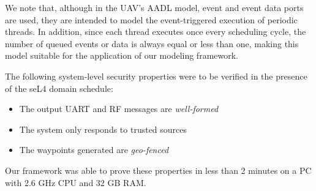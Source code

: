 We note that, although in the UAV's AADL model, event and event data ports are used, they are intended to model the event-triggered execution of periodic threads.
In addition, since each thread executes once every scheduling cycle, the number of queued events or data is always equal or less than one,
making this model suitable for the application of our modeling framework.

The following system-level security properties were to be verified in the presence of the seL4 domain schedule:
\begin{itemize}
	\item The output UART and RF messages are \emph{well-formed}
	\item The system only responds to trusted sources
	\item The waypoints generated are \emph{geo-fenced}
\end{itemize}
Our framework was able to prove these properties in less than 2 minutes on a PC with 2.6 GHz CPU and 32 GB RAM.

